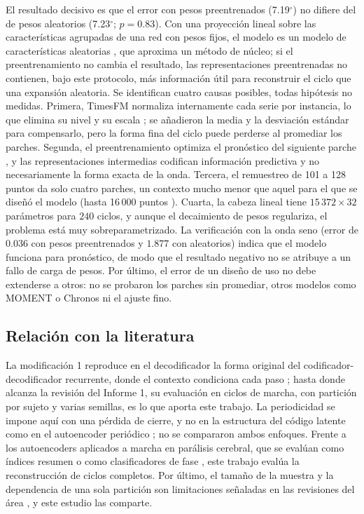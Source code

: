 \documentclass[11pt,a4paper]{article}
\newcommand{\gr}{$^{\circ}$}
\begin{document}
El resultado decisivo es que el error con pesos preentrenados (7.19\gr) no difiere del de pesos aleatorios (7.23\gr; $p=0.83$). Con una proyección lineal sobre las características agrupadas de una red con pesos fijos, el modelo es un modelo de características aleatorias \cite{rahimi2007}, que aproxima un método de núcleo; si el preentrenamiento no cambia el resultado, las representaciones preentrenadas no contienen, bajo este protocolo, más información útil para reconstruir el ciclo que una expansión aleatoria. Se identifican cuatro causas posibles, todas hipótesis no medidas. Primera, TimesFM normaliza internamente cada serie por instancia, lo que elimina su nivel y su escala \cite{kim2022revin}; se añadieron la media y la desviación estándar para compensarlo, pero la forma fina del ciclo puede perderse al promediar los parches. Segunda, el preentrenamiento optimiza el pronóstico del siguiente parche \cite{das2024timesfm}, y las representaciones intermedias codifican información predictiva y no necesariamente la forma exacta de la onda. Tercera, el remuestreo de 101 a 128 puntos da solo cuatro parches, un contexto mucho menor que aquel para el que se diseñó el modelo (hasta 16\,000 puntos \cite{timesfm25}). Cuarta, la cabeza lineal tiene $15\,372\times32$ parámetros para $240$ ciclos, y aunque el decaimiento de pesos regulariza, el problema está muy sobreparametrizado. La verificación con la onda seno (error de $0.036$ con pesos preentrenados y $1.877$ con aleatorios) indica que el modelo funciona para pronóstico, de modo que el resultado negativo no se atribuye a un fallo de carga de pesos. Por último, el error de un diseño de uso no debe extenderse a otros: no se probaron los parches sin promediar, otros modelos como MOMENT o Chronos \cite{goswami2024moment,ansari2024chronos} ni el ajuste fino.

\subsection{Relación con la literatura}

La modificación 1 reproduce en el decodificador la forma original del codificador-decodificador recurrente, donde el contexto condiciona cada paso \cite{cho2014}; hasta donde alcanza la revisión del Informe 1, su evaluación en ciclos de marcha, con partición por sujeto y varias semillas, es lo que aporta este trabajo. La periodicidad se impone aquí con una pérdida de cierre, y no en la estructura del código latente como en el autoencoder periódico \cite{starke2022}; no se compararon ambos enfoques. Frente a los autoencoders aplicados a marcha en parálisis cerebral, que se evalúan como índices resumen o como clasificadores de fase \cite{wang2024,pang2025}, este trabajo evalúa la reconstrucción de ciclos completos. Por último, el tamaño de la muestra y la dependencia de una sola partición son limitaciones señaladas en las revisiones del área \cite{samadi2024}, y este estudio las comparte.
\end{document}
